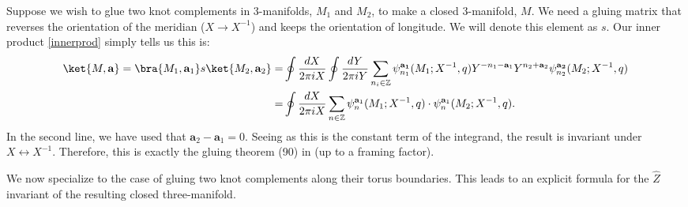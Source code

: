 \documentclass{article}
\newcommand{\Z}{{\mathbb Z}}
\numberwithin{corollary}{theorem}
\numberwithin{corollary}{proposition}
\begin{document}
Suppose we wish to glue two knot complements in 3-manifolds, $M_1$ and $M_2$, to make a closed 3-manifold, $M$. We need a gluing matrix that reverses the orientation of the meridian ($X\rightarrow X^{-1} $) and keeps the orientation of longitude. We will denote this element as $s$. Our inner product \eqref{innerprod} simply tells us this is:
\begin{align*}
    \ket{M,\mathbf{a}} = \bra{M_1,\mathbf{a}_1} s \ket{M_2,\mathbf{a}_2} = & \oint \frac{dX}{2\pi i X} \oint \frac{dY}{2\pi i Y} \sum_{n_i\in \Z} \psi^\mathbf{a_1}_{n_1}  (M_1;X^{-1},q) Y^{-n_1-\mathbf{a}_1} Y^{n_2+\mathbf{a}_2} \psi^\mathbf{a_2}_{n_2}  (M_2;X^{-1},q)  \\
    = & \oint \frac{dX}{2\pi i X} \sum_{n\in \mathbb{Z}} \psi^{\mathbf{a}_1}_{n}  (M_1;X^{-1},q) \cdot \psi^{\mathbf{a}_1}_{n} (M_2;X^{-1},q).
\end{align*}
In the second line, we have used that $\mathbf{a}_2-\mathbf{a}_1 =0$. Seeing as this is the constant term of the integrand, the result is invariant under $X\leftrightarrow X^{-1}$. Therefore, this is exactly the gluing theorem (90) in \cite{GM} (up to a framing factor).

We now specialize to the case of gluing two knot complements along their torus boundaries. This leads to an explicit formula for the $\hat{Z}$ invariant of the resulting closed three-manifold.
\end{document}
